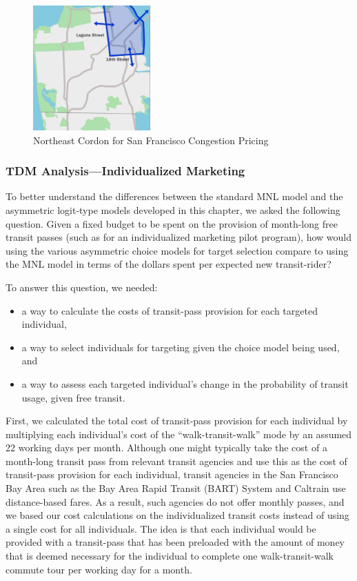 \begin{figure}
\centering
\includegraphics[width=0.4\textwidth]{chapter3/images/Fig3}
\caption{Northeast Cordon for San Francisco Congestion Pricing \citep{sfcta_san_2010}}
\label{fig:northeast_cordon}
\end{figure}

\subsubsection{TDM Analysis---Individualized Marketing}
\label{sec:application_tdm_analysis_procedures}
To better understand the differences between the standard MNL model and the asymmetric logit-type models developed in this chapter, we asked the following question. Given a fixed budget to be spent on the provision of month-long free transit passes (such as for an individualized marketing pilot program), how would using the various asymmetric choice models for target selection compare to using the MNL model in terms of the dollars spent per expected new transit-rider?

To answer this question, we needed:
\begin{itemize}
\item a way to calculate the costs of transit-pass provision for each targeted individual,
\item a way to select individuals for targeting given the choice model being used, and
\item a way to assess each targeted individual's change in the probability of transit usage, given free transit.
\end{itemize}
First, we calculated the total cost of transit-pass provision for each individual by multiplying each individual's cost of the ``walk-transit-walk'' mode by an assumed 22 working days per month. Although one might typically take the cost of a month-long transit pass from relevant transit agencies and use this as the cost of transit-pass provision for each individual, transit agencies in the San Francisco Bay Area such as the Bay Area Rapid Transit (BART) System and Caltrain use distance-based fares. As a result, such agencies do not offer monthly passes, and we based our cost calculations on the individualized transit costs instead of using a single cost for all individuals. The idea is that each individual would be provided with a transit-pass that has been preloaded with the amount of money that is deemed necessary for the individual to complete one walk-transit-walk commute tour per working day for a month.

